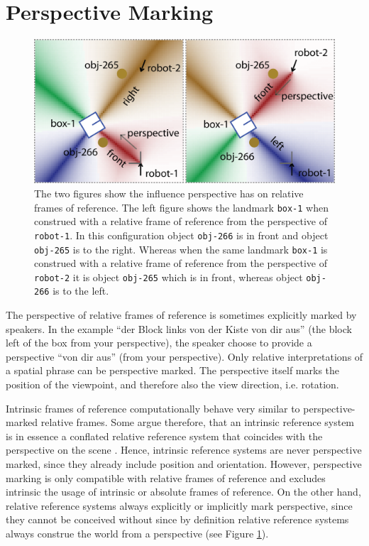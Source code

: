 \section{Perspective Marking}

\begin{figure}
\begin{center}
\includegraphics[width=0.7\columnwidth]{figs/space-scene-3-influence-perspective.png}
\caption[Influence of perspective on relative frames of reference.]
{The two figures show the influence perspective has on relative frames of reference.
The left figure shows the landmark {\footnotesize\tt box-1} when construed with a relative frame of reference
from the perspective of {\footnotesize\tt robot-1}. 
In this configuration object {\footnotesize\tt obj-266} is in front and object {\footnotesize\tt obj-265} is to the right.
Whereas when the same landmark {\footnotesize\tt box-1} is construed with a relative frame of reference
from the perspective of {\footnotesize\tt robot-2} it is object {\footnotesize\tt obj-265} which is in front,
whereas object {\footnotesize\tt obj-266} is to the left.}
\label{f:influence-perspective}
\end{center}
\end{figure}

The perspective of relative frames of reference is sometimes explicitly marked
by speakers. In the example ``der Block links von der Kiste von dir aus'' (the block left of the box from your perspective),
the speaker choose to provide a perspective ``von dir aus'' (from your
perspective). Only relative interpretations of a spatial phrase can be perspective 
marked. The perspective itself marks the position of the viewpoint, and therefore 
also the view direction, i.e. rotation. 

Intrinsic frames of reference computationally behave very similar to perspective-marked 
relative frames. Some argue therefore, that an intrinsic reference system is in essence a 
conflated relative reference system that coincides with the perspective 
on the scene \citep{levinson1996language}. 
Hence, intrinsic reference systems are never perspective marked, since they already 
include position and orientation. However, perspective marking is only compatible with relative 
frames of reference and excludes intrinsic the usage
of intrinsic or absolute frames of reference. 
On the other hand, relative reference systems always explicitly or implicitly mark 
perspective, since they cannot be conceived without since by definition relative 
reference systems always construe the world from a perspective (see
Figure \ref{f:influence-perspective}).

